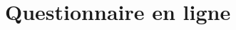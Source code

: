%
\section{Questionnaire en ligne}

\newcommand{\fqdata}[2]{\expandafter\gdef\csname fqd#1\endcsname{#2}}

